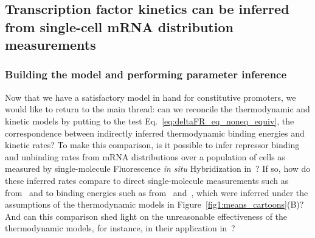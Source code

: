 \subsection{Transcription factor kinetics can be inferred from single-cell mRNA
distribution measurements}\label{sec:rep_kinetics_inference}
\subsubsection{Building the model and performing parameter inference}

Now that we have a satisfactory model in hand for constitutive promoters, we
would like to return to the main thread: can we reconcile the thermodynamic and
kinetic models by putting to the test Eq.~\ref{eq:deltaFR_eq_noneq_equiv}, the
correspondence between indirectly inferred thermodynamic binding energies and
kinetic rates? To make this comparison, is it possible to infer repressor
binding and unbinding rates from mRNA distributions over a population of cells
as measured by single-molecule Fluorescence \textit{in situ} Hybridization
in~\cite{Jones2014}? If so, how do these inferred rates compare to direct
single-molecule measurements such as from~\cite{Hammar2014} and to binding
energies such as from~\cite{Garcia2011a} and~\cite{Razo-Mejia2018}, which were
inferred under the assumptions of the thermodynamic models in
Figure~\ref{fig1:means_cartoons}(B)? And can this comparison shed light on the
unreasonable effectiveness of the thermodynamic models, for instance, in their
application in~\cite{Chure2019, Chure2019a}?

